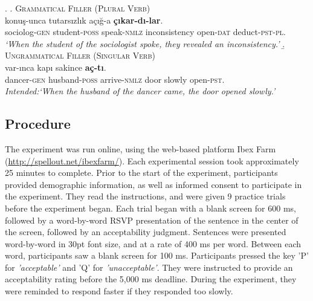 \documentclass[doc,a4paper,man,natbib,floatsintext,noextraspace]{apa6}\usepackage[]{graphicx}\usepackage[]{color}
\begin{document}


\ex. \label{item:exp1FillerItems}
%
\a. \label{item:exp1GrammaticalFiller} \textsc{Grammatical Filler (Plural Verb)}\\ 
   konuş-unca tutarsızlık açığ-a \textbf{çıkar-dı-lar}.\\ %
  sociolog-\textsc{gen}  student-\textsc{poss} speak-\textsc{nmlz} inconsistency  open-\textsc{dat} deduct-\textsc{pst}-\textsc{pl}.\\
  \glt \textit{`When the student of the sociologist spoke, they revealed an inconsistency.'}
%
%
\b. \textsc{Ungrammatical Filler (Singular Verb)}\\ 
 var-ınca kapı sakince \textbf{aç-tı}.\\ 
dancer-\textsc{gen}  husband-\textsc{poss} arrive-\textsc{nmlz} door slowly  open-\textsc{pst}.\\
\glt \textit{Intended:`When the husband of the dancer came, the door opened slowly.'}

\subsection{Procedure} \label{sec:exp1:procedure}

The experiment was run online, using the web-based platform Ibex Farm (\url{http://spellout.net/ibexfarm/}). Each experimental session took approximately 25 minutes to complete.
%
Prior to the start of the experiment, participants provided demographic information, as well as informed consent to participate in the experiment. They read the instructions, and were given 9 practice trials before the experiment began.
%
Each trial began with a blank screen for 600 ms, followed by a word-by-word RSVP presentation of the sentence in the center of the screen, followed by an acceptability judgment. 
Sentences were presented word-by-word in 30pt font size, and at a rate of 400 ms per word. Between each word, participants saw a blank screen for 100 ms. Participants pressed the key 'P' for \textit{'acceptable'} and 'Q' for \textit{'unacceptable'}. They were instructed to provide an acceptability rating before the 5,000 ms deadline. During the experiment, they were reminded to respond faster if they responded too slowly. 
\end{document}
